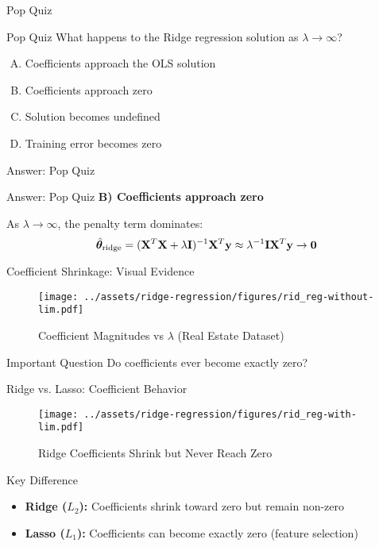\documentclass{beamer}
\begin{document}
\begin{frame}{Pop Quiz \thepopquiz}
\begin{popquizbox}{Pop Quiz \thepopquiz}
What happens to the Ridge regression solution as $\lambda \to \infty$?
\begin{enumerate}[A)]
\item Coefficients approach the OLS solution
\item Coefficients approach zero
\item Solution becomes undefined
\item Training error becomes zero
\end{enumerate}
\end{popquizbox}
\end{frame}

\begin{frame}{Answer: Pop Quiz \thepopquiz}
\begin{popquizbox}{Answer: Pop Quiz \thepopquiz}
\textbf{B) Coefficients approach zero}

\vspace{0.3cm}
As $\lambda \to \infty$, the penalty term dominates:
$$\hat{\boldsymbol{\theta}}_{\text{ridge}} = (\mathbf{X}^T\mathbf{X} + \lambda\mathbf{I})^{-1}\mathbf{X}^T\mathbf{y} \approx \lambda^{-1}\mathbf{I} \mathbf{X}^T\mathbf{y} \to \mathbf{0}$$
\end{popquizbox}
\end{frame}

\begin{frame}{Coefficient Shrinkage: Visual Evidence}
\begin{figure}\texttt{[image: ../assets/ridge-regression/figures/rid\_reg-without-lim.pdf]}\caption{Coefficient Magnitudes vs $\lambda$ (Real Estate Dataset)}
\end{figure}

\begin{alertbox}{Important Question}
Do coefficients ever become exactly zero?
\end{alertbox}
\end{frame}

\begin{frame}{Ridge vs. Lasso: Coefficient Behavior}
\begin{figure}\texttt{[image: ../assets/ridge-regression/figures/rid\_reg-with-lim.pdf]}\caption{Ridge Coefficients Shrink but Never Reach Zero}
\end{figure}

\begin{keypointsbox}{Key Difference}
\begin{itemize}
\item \textbf{Ridge ($L_2$):} Coefficients shrink toward zero but remain non-zero
\item \textbf{Lasso ($L_1$):} Coefficients can become exactly zero (feature selection)
\end{itemize}
\end{keypointsbox}
\end{frame}
\end{document}
